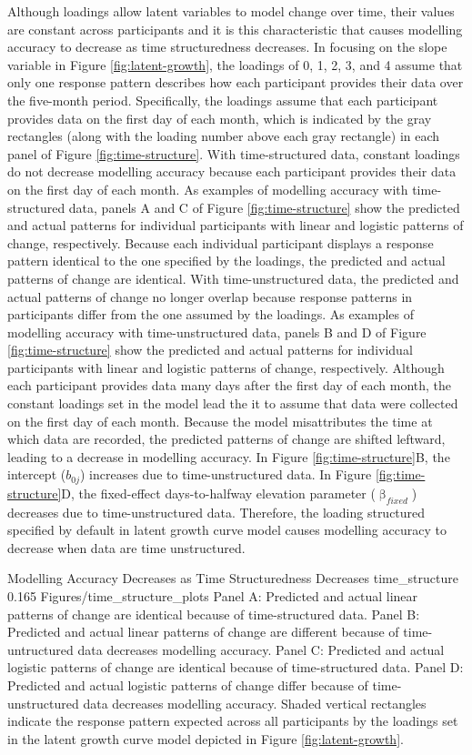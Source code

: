 \documentclass[
12pt, %
twoside,
english]{guelphthesis}
\begin{document}
Although loadings allow latent variables to model change over time, their values are constant across participants and it is this characteristic that causes modelling accuracy to decrease as time structuredness decreases. In focusing on the slope variable in Figure \ref{fig:latent-growth}, the loadings of 0, 1, 2, 3, and 4 assume that only one response pattern describes how each participant provides their data over the five-month period. Specifically, the loadings assume that each participant provides data on the first day of each month, which is indicated by the gray rectangles (along with the loading number above each gray rectangle) in each panel of Figure \ref{fig:time-structure}. With time-structured data, constant loadings do not decrease modelling accuracy because each participant provides their data on the first day of each month. As examples of modelling accuracy with time-structured data, panels A and C of Figure \ref{fig:time-structure} show the predicted and actual patterns for individual participants with linear and logistic patterns of change, respectively. Because each individual participant displays a response pattern identical to the one specified by the loadings, the predicted and actual patterns of change are identical. With time-unstructured data, the predicted and actual patterns of change no longer overlap because response patterns in participants differ from the one assumed by the loadings. As examples of modelling accuracy with time-unstructured data, panels B and D of Figure \ref{fig:time-structure} show the predicted and actual patterns for individual participants with linear and logistic patterns of change, respectively. Although each participant provides data many days after the first day of each month, the constant loadings set in the model lead the it to assume that data were collected on the first day of each month. Because the model misattributes the time at which data are recorded, the predicted patterns of change are shifted leftward, leading to a decrease in modelling accuracy. In Figure \ref{fig:time-structure}B, the intercept (\(b_{0j}\)) increases due to time-unstructured data. In Figure \ref{fig:time-structure}D, the fixed-effect days-to-halfway elevation parameter (\(\upbeta_{fixed}\)) decreases due to time-unstructured data. Therefore, the loading structured specified by default in latent growth curve model causes modelling accuracy to decrease when data are time unstructured.
\begin{apaFigure}
[portrait]
[samepage]
[-0.2cm]
{Modelling Accuracy Decreases as Time Structuredness Decreases}
{time_structure}
{0.165}
{Figures/time_structure_plots}
{Panel A: Predicted and actual linear patterns of change are identical because of time-structured data. Panel B: Predicted and actual linear patterns of change are different because of time-untructured data decreases modelling accuracy. Panel C: Predicted and actual logistic patterns of change are identical because of time-structured data. Panel D: Predicted and actual logistic patterns of change differ because of time-unstructured data decreases modelling accuracy. Shaded vertical rectangles indicate the response pattern expected across all participants by the loadings set in the latent growth curve model depicted in Figure \ref{fig:latent-growth}.}
\end{apaFigure}
\end{document}
